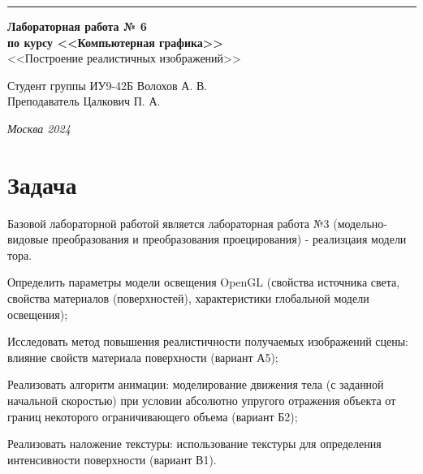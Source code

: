 \documentclass[a4paper, 14pt]{extarticle}
\begin{document}
\begin{titlepage}
\vspace*{-16pt}
\hspace{30pt}\rule{0.866\textwidth}{0.4pt}
  
\vspace{11em}

\begin{center}
\Large {\bf Лабораторная работа № 6} \\
\large {\bf по курсу <<Компьютерная графика>>} \\
\large <<Построение реалистичных изображений>>
\end{center}\normalsize

\vspace{8em}


\begin{flushright}
  {Студент группы ИУ9-42Б Волохов А. В.\hspace*{15pt} \\
  \vspace{2ex}
  Преподаватель Цалкович П. А.\hspace*{15pt}}
\end{flushright}

\bigskip

\vfill


\begin{center}
\textsl{Москва 2024}
\end{center}
\end{titlepage}

\renewcommand{\ttdefault}{pcr}

\setlength{\tabcolsep}{3pt}
\newpage
\setcounter{page}{2}

\section{Задача}\label{Sect::task}
Базовой лабораторной работой является лабораторная работа №3 (модельно-видовые
преобразования и преобразования проецирования) - реализцаия модели тора.
\par
Определить параметры модели освещения OpenGL (свойства источника света, свойства
материалов (поверхностей), характеристики глобальной модели освещения);
\par
Исследовать метод повышения реалистичности получаемых изображений сцены: влияние свойств материала поверхности (вариант А5);
\par
Реализовать алгоритм анимации: моделирование движения тела (с заданной начальной скоростью) при
условии абсолютно упругого отражения объекта от границ некоторого ограничивающего объема (вариант Б2);
\par
Реализовать наложение текстуры: использование текстуры для определения интенсивности поверхности (вариант В1).
\end{document}
